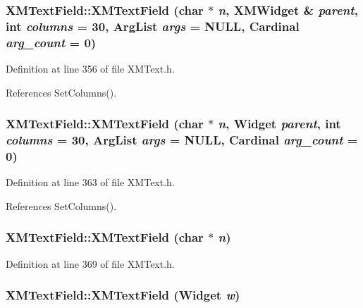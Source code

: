 \subsubsection{\setlength{\rightskip}{0pt plus 5cm}XMText\-Field::XMText\-Field (char $\ast$ {\em n}, {\bf XMWidget} \& {\em parent}, int {\em columns} = 30, Arg\-List {\em args} = NULL, Cardinal {\em arg\_\-count} = 0)\hspace{0.3cm}{\tt  [inline]}}\label{classXMTextField_a0}




Definition at line 356 of file XMText.h.

References Set\-Columns().
\subsubsection{\setlength{\rightskip}{0pt plus 5cm}XMText\-Field::XMText\-Field (char $\ast$ {\em n}, Widget {\em parent}, int {\em columns} = 30, Arg\-List {\em args} = NULL, Cardinal {\em arg\_\-count} = 0)\hspace{0.3cm}{\tt  [inline]}}\label{classXMTextField_a1}




Definition at line 363 of file XMText.h.

References Set\-Columns().
\subsubsection{\setlength{\rightskip}{0pt plus 5cm}XMText\-Field::XMText\-Field (char $\ast$ {\em n})\hspace{0.3cm}{\tt  [inline]}}\label{classXMTextField_a2}




Definition at line 369 of file XMText.h.
\subsubsection{\setlength{\rightskip}{0pt plus 5cm}XMText\-Field::XMText\-Field (Widget {\em w})\hspace{0.3cm}{\tt  [inline]}}\label{classXMTextField_a3}




